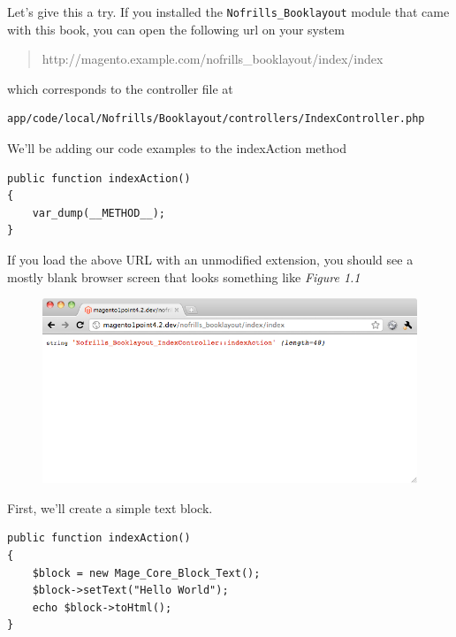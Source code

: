\documentclass[oneside]{book}
\begin{document}
Let's give this a try. If you installed the \footnotesize\texttt{Nofrills\_Booklayout} \normalsize  module that came with this book, you can open the following url on your system

\begin{quote}
http://magento.example.com/nofrills\_booklayout/index/index
\end{quote}

which corresponds to the controller file at

\begin{lstlisting}
app/code/local/Nofrills/Booklayout/controllers/IndexController.php

\end{lstlisting}


We'll be adding our code examples to the indexAction method

\begin{lstlisting}
public function indexAction()
{
    var_dump(__METHOD__);
}

\end{lstlisting}


If you load the above URL with an unmodified extension, you should see a mostly blank browser screen that looks something like \emph{Figure 1.1}

\begin{figure}[htb]
\begin{center}
\leavevmode
\includegraphics[width=1\textwidth]{images/chapter1/start.png}
\end{center}
\caption{}
\end{figure}


First, we'll create a simple text block.

\begin{lstlisting}
public function indexAction()
{
    $block = new Mage_Core_Block_Text();
    $block->setText("Hello World");
    echo $block->toHtml();
}

\end{lstlisting}
\end{document}
